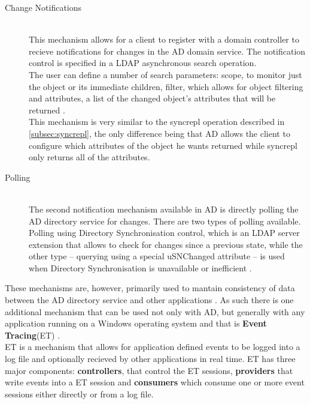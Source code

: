 \begin{description}
    \item[Change Notifications]\hfill \\
        This mechanism allows for a client to register with a domain controller to recieve notifications for changes in the AD domain service. The notification control is specified in a LDAP asynchronous search
        operation. \\
        The user can define a number of search parameters: scope, to monitor just the object or its immediate children, filter, which allows for object filtering and
        attributes, a list of the changed object's attributes that will be returned \cite{ADtrack}.\\
        This mechanism is very similar to the syncrepl operation described in \ref{subsec:syncrepl}, the only difference being that AD allows the client to configure which attributes of the object he wants returned
        while syncrepl only returns all of the attributes.
    \item[Polling]\hfill \\
        The second notification mechanism available in AD is directly polling the AD directory service for changes.
        There are two types of polling available. Polling using Directory Synchronisation control, which is an LDAP server extension that allows to check for changes since a previous state,
        while the other type -- querying using a special uSNChanged attribute -- is used when Directory Synchronisation is unavailable or inefficient \cite{ADtrack}.
\end{description}

These mechanisms are, however, primarily used to mantain consistency of data between the AD directory service and other applications \cite{ADtrack}.
As such there is one additional mechanism that can be used not only with AD, but generally with any application running on a Windows operating system and that is \textbf{Event Tracing}(ET) \cite{ADtrace}. \\
ET is a mechanism that allows for application defined events to be logged into a log file and optionally recieved by other applications in real time.
ET has three major components:%
\textbf{controllers}, that control the ET sessions, \textbf{providers} that write events into a ET session and \textbf{consumers} which consume one or more event sessions either directly or from a log file.



